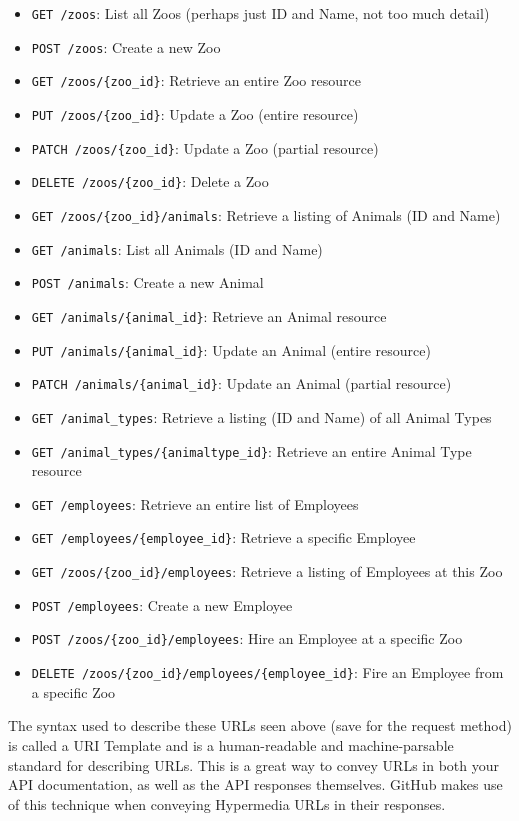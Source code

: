 \documentclass{book}
\begin{document}
\begin{itemize}
\item \texttt{GET /zoos}: List all Zoos (perhaps just ID and Name, not too much detail)
\item \texttt{POST /zoos}: Create a new Zoo
\item \texttt{GET /zoos/\{zoo\_id\}}: Retrieve an entire Zoo resource
\item \texttt{PUT /zoos/\{zoo\_id\}}: Update a Zoo (entire resource)
\item \texttt{PATCH /zoos/\{zoo\_id\}}: Update a Zoo (partial resource)
\item \texttt{DELETE /zoos/\{zoo\_id\}}: Delete a Zoo
\item \texttt{GET /zoos/\{zoo\_id\}/animals}: Retrieve a listing of Animals (ID and Name)
\item \texttt{GET /animals}: List all Animals (ID and Name)
\item \texttt{POST /animals}: Create a new Animal
\item \texttt{GET /animals/\{animal\_id\}}: Retrieve an Animal resource
\item \texttt{PUT /animals/\{animal\_id\}}: Update an Animal (entire resource)
\item \texttt{PATCH /animals/\{animal\_id\}}: Update an Animal (partial resource)
\item \texttt{GET /animal\_types}: Retrieve a listing (ID and Name) of all Animal Types
\item \texttt{GET /animal\_types/\{animaltype\_id\}}: Retrieve an entire Animal Type resource
\item \texttt{GET /employees}: Retrieve an entire list of Employees
\item \texttt{GET /employees/\{employee\_id\}}: Retrieve a specific Employee
\item \texttt{GET /zoos/\{zoo\_id\}/employees}: Retrieve a listing of Employees at this Zoo
\item \texttt{POST /employees}: Create a new Employee
\item \texttt{POST /zoos/\{zoo\_id\}/employees}: Hire an Employee at a specific Zoo
\item \texttt{DELETE /zoos/\{zoo\_id\}/employees/\{employee\_id\}}: Fire an Employee from a specific Zoo
\end{itemize}

The syntax used to describe these URLs seen above (save for the request method) is called a URI Template and is a human-readable and machine-parsable standard for describing URLs. This is a great way to convey URLs in both your API documentation, as well as the API responses themselves. GitHub makes use of this technique when conveying Hypermedia URLs in their responses.
\end{document}
